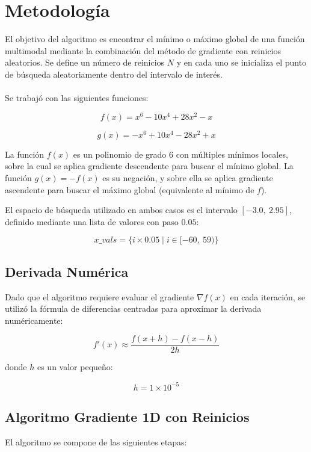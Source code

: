 \documentclass[11pt]{article}
\begin{document}
\section{Metodología}

El objetivo del algoritmo es encontrar el mínimo o máximo global de una función multimodal mediante la combinación del método de gradiente con reinicios aleatorios. Se define un número de reinicios $N$ y en cada uno se inicializa el punto de búsqueda aleatoriamente dentro del intervalo de interés.\\ \\
Se trabajó con las siguientes funciones:

\[
f(x) = x^6 - 10x^4 + 28x^2 - x
\]

\[
g(x) = -x^6 + 10x^4 - 28x^2 + x
\]

La función $f(x)$ es un polinomio de grado 6 con múltiples mínimos locales, sobre la cual se aplica gradiente descendente para buscar el mínimo global. La función $g(x) = -f(x)$ es su negación, y sobre ella se aplica gradiente ascendente para buscar el máximo global (equivalente al mínimo de $f$).

El espacio de búsqueda utilizado en ambos casos es el intervalo $[-3.0,\ 2.95]$, definido mediante una lista de valores con paso $0.05$:

\[
x\_vals = \{i \times 0.05 \mid i \in [-60,\ 59)\}
\]

\subsection{Derivada Numérica}

Dado que el algoritmo requiere evaluar el gradiente $\nabla f(x)$ en cada iteración, se utilizó la fórmula de diferencias centradas para aproximar la derivada numéricamente:

\[
f'(x) \approx \frac{f(x+h) - f(x-h)}{2h}
\]

donde $h$ es un valor pequeño:

\[
h = 1 \times 10^{-5}
\]

\subsection{Algoritmo Gradiente 1D con Reinicios}

El algoritmo se compone de las siguientes etapas:
\end{document}
